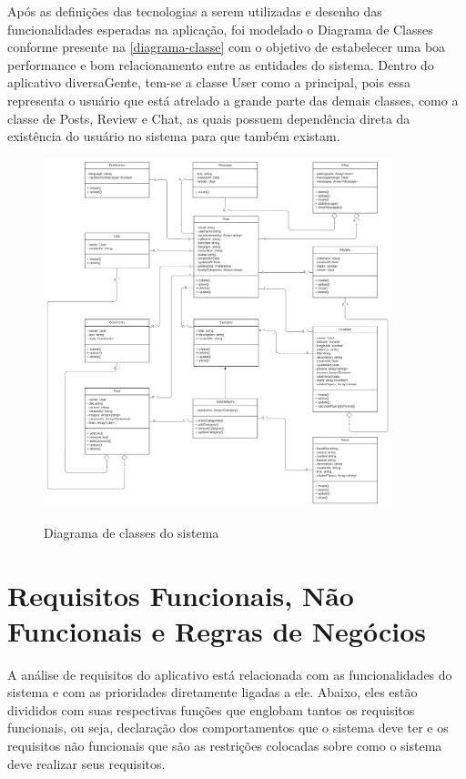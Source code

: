 Após as definições das tecnologias a serem utilizadas e desenho das funcionalidades esperadas na aplicação, foi modelado o Diagrama de Classes conforme presente na \autoref{diagrama-classe} com o objetivo de estabelecer uma boa performance e bom relacionamento entre as entidades do sistema. 
Dentro do aplicativo diversaGente, tem-se a classe User como a principal, pois essa representa o usuário que está atrelado a grande parte das demais classes, como a classe de Posts, Review e Chat, as quais possuem dependência direta da existência do usuário no sistema para que também existam. 

\begin{figure}[htb]
	\centering
	\caption{\label{fig_arq_virado}Diagrama de classes do sistema}
	\includegraphics[width=0.90\textwidth]{anexos/diversaGente_-_Classe_UML_1.png}
	\label{diagrama-classe}
\end{figure}

\section{Requisitos Funcionais, Não Funcionais e Regras de Negócios}


A análise de requisitos do aplicativo está relacionada com as funcionalidades do sistema e com as prioridades diretamente ligadas a ele. Abaixo, eles estão divididos com suas respectivas funções que englobam tantos os requisitos funcionais, ou seja, declaração dos comportamentos que o sistema deve ter e os requisitos não funcionais que são as restrições colocadas sobre como o sistema deve realizar seus requisitos.

